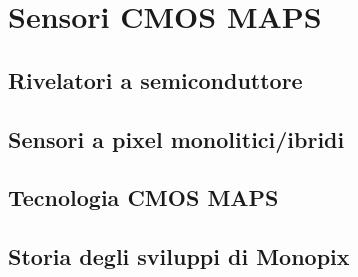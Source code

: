 \chapter{Sensori CMOS MAPS}


\section{Rivelatori a semiconduttore}

\section{Sensori a pixel monolitici/ibridi}

\section{Tecnologia CMOS MAPS}

\begin{comment}
small fill factor /large fill factor
\end{comment}

\section{Storia degli sviluppi di Monopix}
